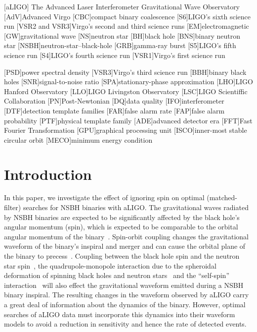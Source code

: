 


[aLIGO]
{The Advanced Laser Interferometer Gravitational Wave Observatory}
[AdV]{Advanced Virgo}
[CBC]{compact binary coalescence}
[S6]{LIGO's sixth science run}
[VSR2 and VSR3]{Virgo's second and third science runs}
[EM]{electromagnetic}
[GW]{gravitational wave}
[NS]{neutron star}
[BH]{black hole}
[BNS]{binary neutron star}
[NSBH]{neutron-star--black-hole}
[GRB]{gamma-ray burst}
[S5]{LIGO's fifth science run}
[S4]{LIGO's fourth science run}
[VSR1]{Virgo's first science run}

[PSD]{power spectral density}
[VSR3]{Virgo's third science run}
[BBH]{binary black holes}
[SNR]{signal-to-noise ratio}
[SPA]{stationary-phase approximation}
[LHO]{LIGO Hanford Observatory}
[LLO]{LIGO Livingston Observatory}
[LSC]{LIGO Scientiffic Collaboration}
[PN]{Post-Newtonian}
[DQ]{data quality}
[IFO]{interferometer}
[DTF]{detection template families}
[FAR]{false alarm rate}
[FAP]{false alarm probability}
[PTF]{physical template family}
[ADE]{advanced detector era}
[FFT]{Fast Fourier Transformation}
[GPU]{graphical processing unit}
[ISCO]{inner-most stable circular orbit}
[MECO]{minimum energy condition}

\section{Introduction}
\label{sec:intro}

In this paper, we investigate the effect of ignoring spin on optimal
(matched-filter) searches for \ac{NSBH} binaries with \ac{aLIGO}.
The gravitational waves radiated by \ac{NSBH} binaries are expected to be
significantly affected by the black hole's angular momentum
(spin), which is expected to be comparable to the orbital angular momentum of
the binary~\cite{Cutler:1992tc,Apostolatos:1994mx,Kidder:1992fr,Kidder:1995zr}.
Spin-orbit coupling changes the gravitational waveform of the binary's inspiral
and merger and can cause the orbital plane of the binary to
precess~\cite{Apostolatos:1994mx}. Coupling between the black hole spin and the
neutron star spin~\cite{Kidder:1995zr}, the quadrupole-monopole interaction due
to the spheroidal deformation of spinning black holes and neutron
stars~\cite{Poisson:1997ha} and the ``self-spin''
interaction~\cite{Mikoczi:2005dn} will also effect the gravitational waveform
emitted during a \ac{NSBH} binary inspiral.
The resulting changes in the waveform observed by \ac{aLIGO}
carry a great deal of information about the dynamics of the binary. However,
optimal searches of \ac{aLIGO} data must incorporate this dynamics into their
waveform models to avoid a reduction in sensitivity and hence the rate of
detected events.

